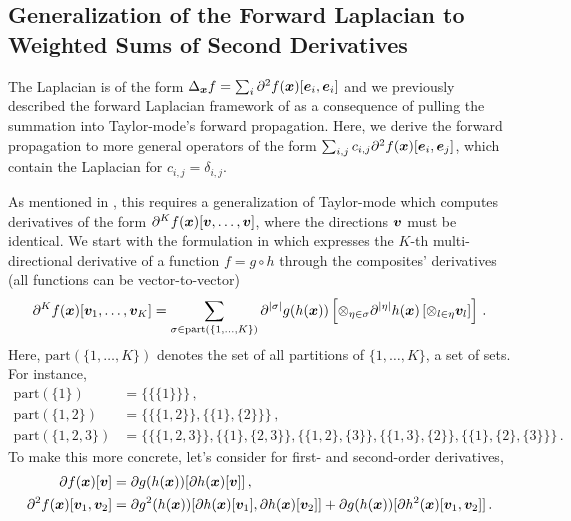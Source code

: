 \subsection{Generalization of the Forward Laplacian to Weighted Sums of Second Derivatives}\label{sec:generalized-forward-laplacian}
The Laplacian is of the form $\Delta_{{\bm{x}}}f = \sum_{i} \partial^2f({\bm{x}})[{\bm{e}}_i, {\bm{e}}_i]$ and we previously described the forward Laplacian framework of \citet{li2023forward} as a consequence of pulling the summation into Taylor-mode's forward propagation.
Here, we derive the forward propagation to more general operators of the form $\sum_{i,j} c_{i,j} \partial^2f({\bm{x}})[{\bm{e}}_i, {\bm{e}}_j]$, which contain the Laplacian for $c_{i,j} = \delta_{i,j}$.

As mentioned in , this requires a generalization of Taylor-mode which computes derivatives of the form $\partial^K f({\bm{x}}) [{\bm{v}}, \dots, {\bm{v}}]$, where the directions ${\bm{v}}$ must be identical. We start with the formulation in \cite{johnson2021taylor-made} which expresses the $K$-th multi-directional derivative of a function $f = g \circ h$ through the composites' derivatives (all functions can be vector-to-vector)
\begin{align}
  \label{eq:taylor-mode-multi-directional}
  \partial^K f({\bm{x}})[{\bm{v}}_1, \dots, {\bm{v}}_K]
  =
  \sum_{\sigma \in \mathrm{part}(\{1, \dots, K\})}
  \partial^{|\sigma|}g(h({\bm{x}}))
  \left[
  \otimes_{\eta \in \sigma} \partial^{|\eta|}h({\bm{x}}) \left[ \otimes_{l \in \eta} {\bm{v}}_l \right]
  \right]\,.
\end{align}
Here, $\mathrm{part}(\{1, \dots, K\})$ denotes the set of all partitions of $\{1, \dots, K\}$, a set of sets. For instance,
\begin{align*}
  \mathrm{part}(\{1\})
  &=
    \{
    \{ \{1 \} \}
    \}\,,
  \\
  \mathrm{part}(\{1,2\})
  &=
    \{
    \{ \{1,2\} \}, \{ \{1\}, \{2\} \}
    \}\,,
  \\
  \mathrm{part}(\{1,2,3\})
  &=
    \{
    \{ \{1,2,3\} \},
    \{ \{1\}, \{2,3\} \},
    \{ \{1,2\}, \{3\} \},
    \{ \{1,3\}, \{2\} \},
    \{ \{1\}, \{2\}, \{3\} \}
    \}\,.
\end{align*}
To make this more concrete, let's consider  for first- and second-order derivatives,
\begin{subequations}\label{eq:taylor-mode-multi-directional-1-2}
  \begin{align}
    \partial f({\bm{x}}) [{\bm{v}}]
    &=
      \partial g(h({\bm{x}})) [\partial h({\bm{x}}) [{\bm{v}}]]\,,
    \\  \label{subeq:taylor-mode-multi-directional-1-2}
    \partial^2 f({\bm{x}}) [{\bm{v}}_1, {\bm{v}}_2]
    &=
      \partial g^2(h({\bm{x}})) [\partial h({\bm{x}}) [{\bm{v}}_1], \partial h({\bm{x}}) [{\bm{v}}_2]]
      +
      \partial g(h({\bm{x}})) [\partial h^2({\bm{x}}) [{\bm{v}}_1, {\bm{v}}_2]]\,.
  \end{align}
\end{subequations}

